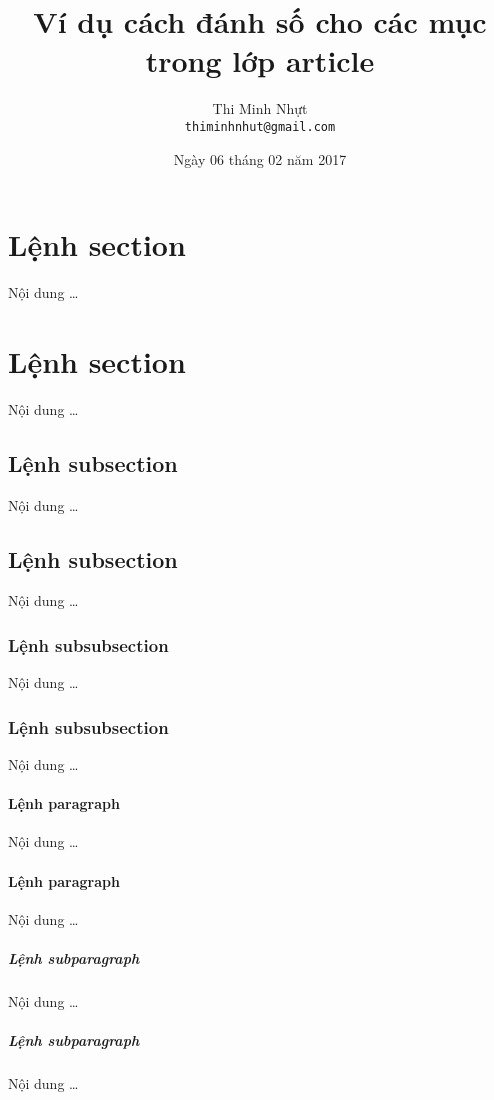 \documentclass[12pt,a4paper]{article}
\title{\bfseries \huge Ví dụ cách đánh số cho các mục trong lớp article}
\author{\Large Thi Minh Nhựt \bigskip \\  \Large \texttt{thiminhnhut@gmail.com}}
\date{\Large Ngày 06 tháng 02 năm 2017}
\begin{document}
\maketitle
\tableofcontents
\thispagestyle{empty}
\newpage

\section{Lệnh section}
Nội dung \ldots
\section{Lệnh section}
Nội dung \ldots

\subsection{Lệnh subsection}
Nội dung \ldots
\subsection{Lệnh subsection}
Nội dung \ldots

\subsubsection{Lệnh subsubsection}
Nội dung \ldots
\subsubsection{Lệnh subsubsection}
Nội dung \ldots

\paragraph{Lệnh paragraph}
Nội dung \ldots
\paragraph{Lệnh paragraph}
Nội dung \ldots

\subparagraph{Lệnh subparagraph}
Nội dung \ldots
\subparagraph{Lệnh subparagraph}
Nội dung \ldots
\end{document}
